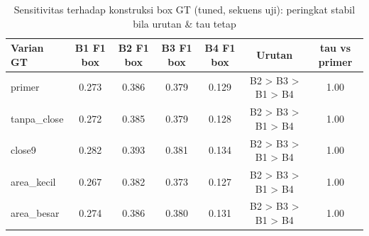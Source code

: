 \begin{table}[t]
\centering
\caption{Sensitivitas terhadap konstruksi box GT (tuned, sekuens uji): peringkat stabil bila urutan \& tau tetap}
\label{tab:table_gt_sensitivity}
\begin{tabular}{lcccccc}
\toprule
Varian GT & B1 F1 box & B2 F1 box & B3 F1 box & B4 F1 box & Urutan & tau vs primer \\
\midrule
primer & 0.273 & 0.386 & 0.379 & 0.129 & B2 > B3 > B1 > B4 & 1.00 \\
tanpa\_close & 0.272 & 0.385 & 0.379 & 0.128 & B2 > B3 > B1 > B4 & 1.00 \\
close9 & 0.282 & 0.393 & 0.381 & 0.134 & B2 > B3 > B1 > B4 & 1.00 \\
area\_kecil & 0.267 & 0.382 & 0.373 & 0.127 & B2 > B3 > B1 > B4 & 1.00 \\
area\_besar & 0.274 & 0.386 & 0.380 & 0.131 & B2 > B3 > B1 > B4 & 1.00 \\
\bottomrule
\end{tabular}
\end{table}
